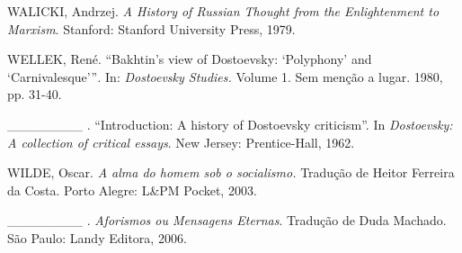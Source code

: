 WALICKI, Andrzej. \emph{A History of Russian Thought from the
Enlightenment to Marxism}. Stanford: Stanford University Press, 1979.

WELLEK, René. ``Bakhtin's view of Dostoevsky: `Polyphony' and
`Carnivalesque'''\emph{.} In: \emph{Dostoevsky Studies.} Volume 1. Sem
menção a lugar. 1980, pp. 31-40.

\_\_\_\_\_\_\_\_ . ``Introduction: A history of Dostoevsky criticism''.
In \emph{Dostoevsky: A collection of critical essays}. New Jersey:
Prentice-Hall, 1962.

WILDE, Oscar. \emph{A alma do homem sob o socialismo.} Tradução de
Heitor Ferreira da Costa. Porto Alegre: L\&PM Pocket, 2003.

\_\_\_\_\_\_\_\_ . \emph{Aforismos ou Mensagens Eternas}. Tradução de
Duda Machado. São Paulo: Landy Editora, 2006.
